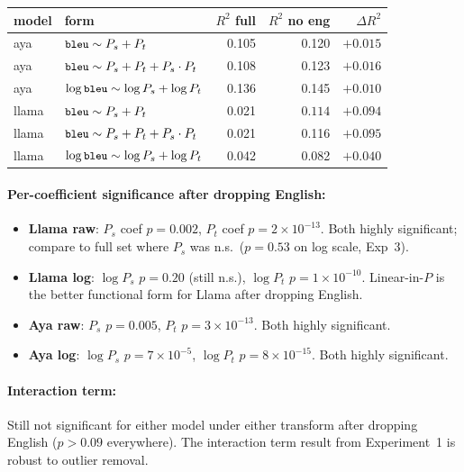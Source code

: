 \documentclass[11pt]{article}
\newcommand{\code}[1]{\texttt{\small #1}}
\begin{document}
\begin{center}
\small
\begin{tabular}{llrrr}
\toprule
model & form & $R^2$ full & $R^2$ no eng & $\Delta R^2$ \\
\midrule
aya   & $\code{bleu} \sim P_s + P_t$                    & 0.105 & 0.120 & $+0.015$ \\
aya   & $\code{bleu} \sim P_s + P_t + P_s \cdot P_t$    & 0.108 & 0.123 & $+0.016$ \\
aya   & $\log\code{bleu} \sim \log P_s + \log P_t$      & 0.136 & 0.145 & $+0.010$ \\
\midrule
llama & $\code{bleu} \sim P_s + P_t$                    & 0.021 & $\mathbf{0.114}$ & $\mathbf{+0.094}$ \\
llama & $\code{bleu} \sim P_s + P_t + P_s \cdot P_t$    & 0.021 & 0.116 & $+0.095$ \\
llama & $\log\code{bleu} \sim \log P_s + \log P_t$      & 0.042 & 0.082 & $+0.040$ \\
\bottomrule
\end{tabular}
\end{center}

\paragraph{Per-coefficient significance after dropping English:}

\begin{itemize}
  \item \textbf{Llama raw}: $P_s$ coef $p = 0.002$, $P_t$ coef $p = 2 \times
    10^{-13}$. Both highly significant; compare to full set where $P_s$ was
    n.s.\ ($p = 0.53$ on log scale, Exp~3).
  \item \textbf{Llama log}: $\log P_s$ $p = 0.20$ (still n.s.), $\log P_t$
    $p = 1 \times 10^{-10}$. Linear-in-$P$ is the better functional form for
    Llama after dropping English.
  \item \textbf{Aya raw}: $P_s$ $p = 0.005$, $P_t$ $p = 3 \times 10^{-13}$.
    Both highly significant.
  \item \textbf{Aya log}: $\log P_s$ $p = 7 \times 10^{-5}$, $\log P_t$
    $p = 8 \times 10^{-15}$. Both highly significant.
\end{itemize}

\paragraph{Interaction term:} Still not significant for either model under
either transform after dropping English ($p > 0.09$ everywhere). The
interaction term result from Experiment~1 is robust to outlier removal.
\end{document}
